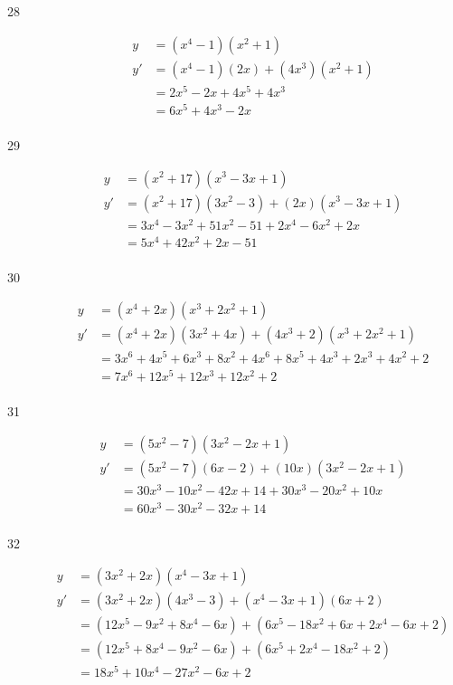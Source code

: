 \documentclass{exam}
\begin{document}
\begin{description}
\item[28]
\begin{align*}
  y &= (x^4 - 1)(x^2 + 1) \\
  y'&= (x^4 - 1)(2x) + (4x^3)(x^2 + 1) \\
    &= 2x^5 - 2x + 4x^5 + 4x^3 \\
    &= 6x^5 + 4x^3 - 2x \\
\end{align*}

\item[29]
\begin{align*}
  y &= (x^2 + 17)(x^3 - 3x + 1) \\
  y'&= (x^2 + 17)(3x^2 - 3) + (2x)(x^3 - 3x + 1) \\
    &= 3x^4 - 3x^2 + 51x^2 - 51 + 2x^4 - 6x^2 + 2x \\
    &= 5x^4 + 42x^2 + 2x - 51 \\
\end{align*}

\item[30]
\begin{align*}
  y &= (x^4 + 2x)(x^3 + 2x^2 + 1) \\
  y'&= (x^4 + 2x)(3x^2 + 4x) + (4x^3 + 2)(x^3 + 2x^2 + 1) \\
    &= 3x^6 + 4x^5 + 6x^3 + 8x^2 + 4x^6 + 8x^5 + 4x^3 + 2x^3 + 4x^2 + 2 \\
    &= 7x^6 + 12x^5 + 12x^3 + 12x^2 + 2 \\
\end{align*}

\item[31]
\begin{align*}
  y &= (5x^2 - 7)(3x^2 - 2x + 1) \\
  y'&= (5x^2 - 7)(6x - 2) + (10x)(3x^2 - 2x + 1) \\
    &= 30x^3 - 10x^2 - 42x + 14 + 30x^3 - 20x^2 + 10x \\
    &= 60x^3 - 30x^2 - 32x + 14 \\
\end{align*}

\item[32]
\begin{align*}
  y &= (3x^2 + 2x)(x^4 - 3x + 1) \\
  y'&= (3x^2 + 2x)(4x^3 - 3) + (x^4 - 3x + 1)(6x + 2) \\
    &= (12x^5 - 9x^2 + 8x^4 - 6x) + (6x^5 - 18x^2 + 6x + 2x^4 - 6x + 2) \\
    &= (12x^5 + 8x^4 - 9x^2 - 6x) + (6x^5 + 2x^4 - 18x^2 + 2) \\
    &= 18x^5 + 10x^4 - 27x^2 - 6x + 2 \\
\end{align*}

\end{description}
\end{document}
